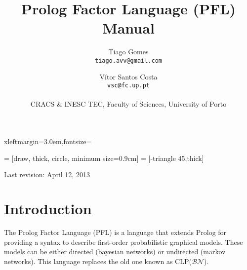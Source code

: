 \documentclass{article}
\begin{document}
 {xleftmargin=3.0em,fontsize=\small}

\newenvironment{pflcode}
  {\VerbatimEnvironment \setstretch{0.8} \begin{pflcodeve}}
  {\end{pflcodeve} }

\newcommand{\true}             {\mathtt{t}}
\newcommand{\false}            {\mathtt{f}}
\newcommand{\pathsep}          { $\triangleright$ }
\newcommand{\tableline}        {\noalign{\hrule height 0.8pt}}
\newcommand{\optionsection}[1] {\subsection*{\texttt{#1}}}

   = [draw, thick, circle, minimum size=0.9cm]
 = [-triangle 45,thick]

\setlength{\parskip}{\baselineskip}

\title{\Huge\textbf{Prolog Factor Language (PFL) Manual}}

\author{Tiago Gomes\\\texttt{tiago.avv@gmail.com} \and V\'{i}tor Santos Costa\\\texttt{vsc@fc.up.pt}\\\\
CRACS \& INESC TEC, Faculty of Sciences, University of Porto
}


\date{}

\maketitle
\thispagestyle{empty}
\vspace{5cm}
\begin{center}
  \large Last revision: April 12, 2013
\end{center}
\newpage



\section{Introduction}
The Prolog Factor Language (PFL) is a language that extends Prolog for providing a syntax to describe first-order probabilistic graphical models. These models can be either directed (bayesian networks) or undirected (markov networks). This language replaces the old one known as CLP($\mathcal{BN}$).
\end{document}
